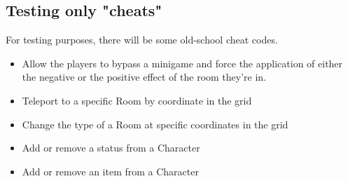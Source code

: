 \subsection{Testing only "cheats"}

For testing purposes, there will be some old-school cheat codes.


\begin{itemize}
	\item Allow the players to bypass a minigame and force the application of either the negative or the positive effect of the room they're in.
	\item Teleport to a specific Room by coordinate in the grid
	\item Change the type of a Room at specific coordinates in the grid
	\item Add or remove a status from a Character
	\item Add or remove an item from a Character
\end{itemize}

\pagebreak 